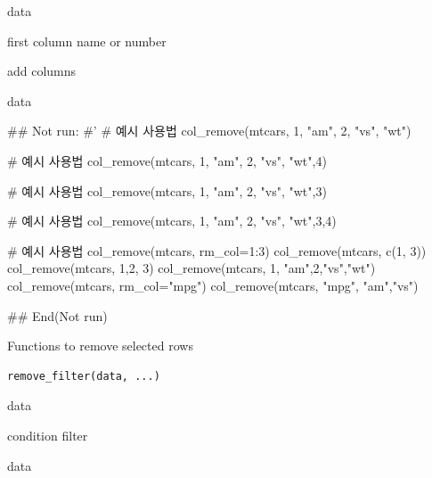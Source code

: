 \documentclass[a4paper]{book}
\begin{document}
%
\begin{Arguments}
\begin{ldescription}
\item[\code{data}] data

\item[\code{rm\_col}] first column name or number

\item[\code{...}] add columns
\end{ldescription}
\end{Arguments}
%
\begin{Value}
data
\end{Value}
%
\begin{Examples}
\begin{ExampleCode}
## Not run: 
#'
# 예시 사용법
col_remove(mtcars, 1, "am", 2, "vs", "wt")

# 예시 사용법
col_remove(mtcars, 1, "am", 2, "vs", "wt",4)


# 예시 사용법
col_remove(mtcars, 1, "am", 2, "vs", "wt",3)


# 예시 사용법
col_remove(mtcars, 1, "am", 2, "vs", "wt",3,4)

# 예시 사용법
col_remove(mtcars, rm_col=1:3)
col_remove(mtcars, c(1, 3))
col_remove(mtcars, 1,2, 3)
col_remove(mtcars, 1, "am",2,"vs","wt")
col_remove(mtcars, rm_col="mpg")
col_remove(mtcars, "mpg", "am","vs")


## End(Not run)


\end{ExampleCode}
\end{Examples}
%
\begin{Description}
Functions to remove selected rows
\end{Description}
%
\begin{Usage}
\begin{verbatim}
remove_filter(data, ...)
\end{verbatim}
\end{Usage}
%
\begin{Arguments}
\begin{ldescription}
\item[\code{data}] data

\item[\code{...}] condition filter
\end{ldescription}
\end{Arguments}
%
\begin{Value}
data
\end{Value}
\end{document}
